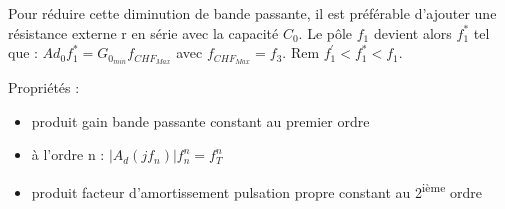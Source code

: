 \documentclass[10pt,a4paper]{article}
\begin{document}
Pour réduire cette diminution de bande passante, il est préférable d'ajouter une résistance externe r en série avec la capacité $C_0$. Le pôle $f_1$ devient alors $f_1^\ast$ tel que : $Ad_0 f_1^\ast = G_{0_{min}} f_{CHF_{Max}}$ avec $f_{CHF_{Max}} = f_3$. Rem $f_1^\prime < f_1^\ast < f_1$.

Propriétés : 
\begin{itemize}
    \item produit gain bande passante constant au premier ordre
    \item à l'ordre n : $\left|A_d\left(jf_n\right)\right|f_n^n = f_T^n$
    \item produit facteur d'amortissement pulsation propre constant au 2\textsuperscript{ième} ordre
\end{itemize}
\end{document}
